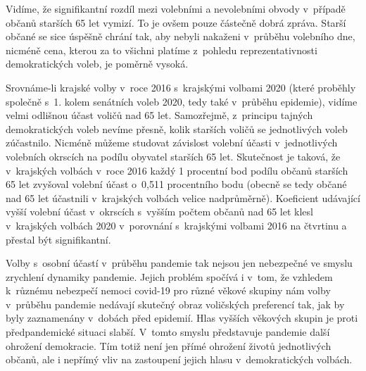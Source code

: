 Vidíme, že signifikantní rozdíl mezi volebními a nevolebními obvody v~případě občanů starších 65 let vymizí. To je ovšem pouze částečně dobrá zpráva. Starší občané se sice úspěšně chrání tak, aby nebyli nakaženi v~průběhu volebního dne, nicméně cena, kterou za to všichni platíme z~pohledu reprezentativnosti demokratických voleb, je poměrně vysoká. 

Srovnáme-li krajské volby v~roce 2016 s~krajskými volbami 2020 (které proběhly společně s~1. kolem senátních voleb 2020, tedy také v~průběhu epidemie), vidíme velmi odlišnou účast voličů nad 65 let. Samozřejmě, z~principu tajných demokratických voleb nevíme přesně, kolik starších voličů se jednotlivých voleb zúčastnilo. Nicméně můžeme studovat závislost volební účasti v~jednotlivých volebních okrscích na podílu obyvatel starších 65 let. Skutečnost je taková, že v~krajských volbách v~roce 2016 každý 1 procentní bod podílu občanů starších 65 let zvyšoval volební účast o~0,511 procentního bodu (obecně se tedy občané nad 65 let účastnili v~krajských volbách velice nadprůměrně). Koeficient udávající vyšší volební účast v~okrscích s~vyšším počtem občanů nad 65 let klesl v~krajských volbách 2020 v~porovnání s~krajskými volbami 2016 na čtvrtinu a přestal být signifikantní.

Volby s~osobní účastí v~průběhu pandemie tak nejsou jen nebezpečné ve smyslu zrychlení dynamiky pandemie. Jejich problém spočívá i v~tom, že vzhledem k~různému nebezpečí nemoci covid-19 pro různé věkové skupiny nám volby v~průběhu pandemie nedávají skutečný obraz voličských preferencí tak, jak by byly zaznamenány v~dobách před epidemií. Hlas vyšších věkových skupin je proti předpandemické situaci slabší. V~tomto smyslu představuje pandemie další ohrožení demokracie. Tím totiž není jen přímé ohrožení životů jednotlivých občanů, ale i nepřímý vliv na zastoupení jejich hlasu v~demokratických volbách.

